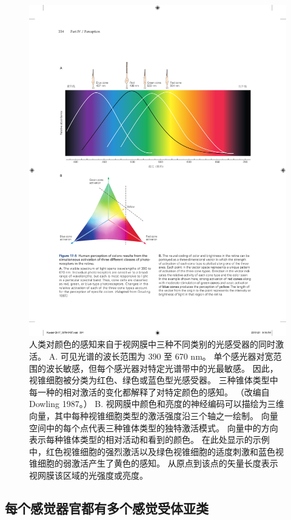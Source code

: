 \begin{figure}[htbp]
	\centering
	\includegraphics[width=1.0\linewidth]{chap17/fig_17_5}
	\caption{人类对颜色的感知来自于视网膜中三种不同类别的光感受器的同时激活。 
		A. 可见光谱的波长范围为 390 至 670 nm。 
		单个感光器对宽范围的波长敏感，但每个感光器对特定光谱带中的光最敏感。 
		因此，视锥细胞被分类为红色、绿色或蓝色型光感受器。 
		三种锥体类型中每一种的相对激活的变化都解释了对特定颜色的感知。 （改编自 Dowling 1987。） 
		B. 视网膜中颜色和亮度的神经编码可以描绘为三维向量，其中每种视锥细胞类型的激活强度沿三个轴之一绘制。 
		向量空间中的每个点代表三种锥体类型的独特激活模式。 
		向量中的方向表示每种锥体类型的相对活动和看到的颜色。 
		在此处显示的示例中，红色视锥细胞的强烈激活以及绿色视锥细胞的适度刺激和蓝色视锥细胞的弱激活产生了黄色的感知。 
		从原点到该点的矢量长度表示视网膜该区域的光强度或亮度。}
	\label{fig:17_5}
\end{figure}


\subsection{每个感觉器官都有多个感觉受体亚类}


